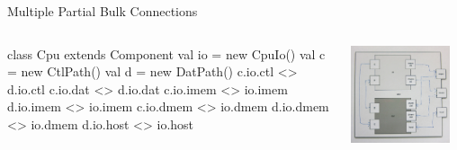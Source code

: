 \documentclass[xcolor=pdflatex,dvipsnames,table]{beamer}
\begin{document}
\begin{frame}[fragile]{Multiple Partial Bulk Connections}
\begin{columns}

\begin{scala}
class Cpu extends Component {
  val io = new CpuIo()
  val c  = new CtlPath()
  val d  = new DatPath()
  c.io.ctl  <> d.io.ctl
  c.io.dat  <> d.io.dat
  c.io.imem <> io.imem
  d.io.imem <> io.imem
  c.io.dmem <> io.dmem
  d.io.dmem <> io.dmem
  d.io.host <> io.host
}
\end{scala}


\begin{center}
\includegraphics[width=0.9\textwidth]{../tutorial/figs/cpu.png} 
\end{center}

\end{columns}
\end{frame}
\end{document}
